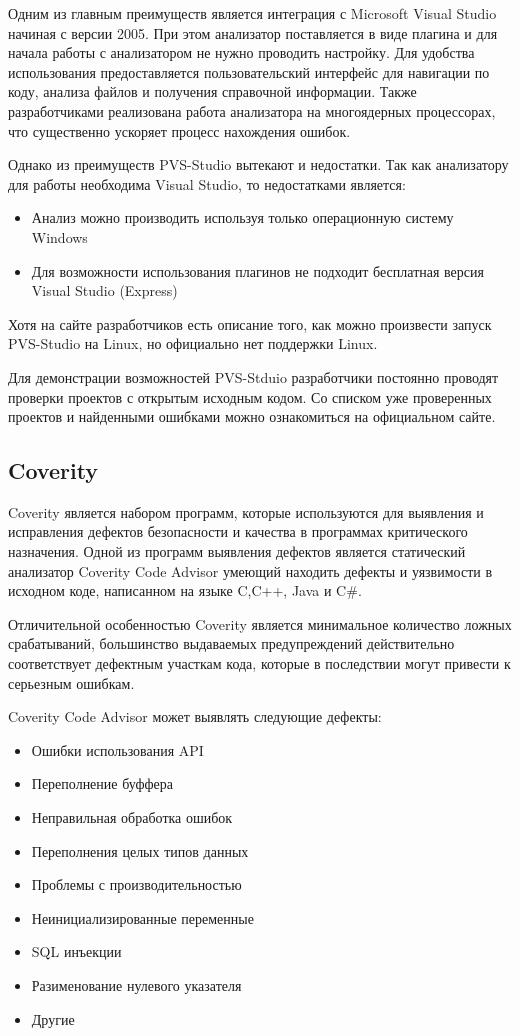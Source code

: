 Одним из главным преимуществ является интеграция с Microsoft Visual Studio начиная с версии 2005.
При этом анализатор поставляется в виде плагина и для начала работы с анализатором не нужно
проводить настройку. Для удобства использования предоставляется пользовательский интерфейс для 
навигации по коду, анализа файлов и получения справочной информации. Также разработчиками реализована 
работа анализатора на многоядерных процессорах, что существенно ускоряет процесс нахождения ошибок.

Однако из преимуществ PVS-Studio вытекают и недостатки. Так как анализатору для работы необходима  
Visual Studio, то недостатками является:
\begin{itemize}
 \item Анализ можно производить используя только операционную систему Windows
 \item Для возможности использования плагинов не подходит бесплатная версия Visual Studio (Express)     
\end{itemize}

Хотя на сайте разработчиков есть описание того, как можно произвести запуск PVS-Studio на Linux, 
но официально нет поддержки Linux.

Для демонстрации возможностей PVS-Stduio разработчики постоянно проводят проверки проектов
с открытым исходным кодом. Со списком уже проверенных проектов и найденными ошибками можно 
ознакомиться на официальном сайте\cite{pvsopen}.

\subsection{Coverity}
Coverity является набором программ, которые используются для выявления и исправления дефектов безопасности
и качества в программах критического назначения. Одной из программ выявления дефектов является
статический анализатор Coverity Code Advisor умеющий находить дефекты и уязвимости в исходном коде, 
написанном на языке C,C++, Java и C\#.  

Отличительной особенностью Coverity является минимальное количество ложных срабатываний, большинство 
выдаваемых предупреждений действительно соответствует дефектным участкам кода, которые в последствии могут
привести к серьезным ошибкам.

Coverity Code Advisor может выявлять следующие дефекты:
\begin{itemize}
	\item Ошибки использования API
	\item Переполнение буффера
	\item Неправильная обработка ошибок
	\item Переполнения целых типов данных
	\item Проблемы с производительностью
	\item Неинициализированные переменные
	\item SQL инъекции
	\item Разименование нулевого указателя
	\item Другие\cite{covall}
\end{itemize}
 
